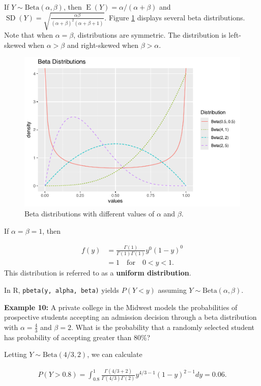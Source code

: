 \documentclass[
]{krantz}
\newcommand{\E}{\operatorname{E}}
\newcommand{\SD}{\operatorname{SD}}
\begin{document}
If \(Y \sim \textrm{Beta}(\alpha, \beta)\), then \(\E(Y) = \alpha/(\alpha + \beta)\) and \(\SD(Y) = \displaystyle \sqrt{\frac{\alpha \beta}{(\alpha + \beta)^2 (\alpha+\beta+1)}}\). Figure \ref{fig:multBeta} displays several beta distributions.  Note that when \(\alpha = \beta\), distributions are symmetric. The distribution is left-skewed when \(\alpha > \beta\) and right-skewed when \(\beta > \alpha\).



\begin{figure}

{\centering \includegraphics[width=0.6\linewidth]{bookdown-BeyondMLR_files/figure-latex/multBeta-1} 

}

\caption{Beta distributions with different values of \(\alpha\) and \(\beta\).}\label{fig:multBeta}
\end{figure}

If \(\alpha = \beta = 1\), then

\begin{align*}
 f(y) &= \frac{\Gamma(1)}{\Gamma(1)\Gamma(1)}y^0(1-y)^0 \\
      &= 1 \quad \textrm{for} \quad 0 < y < 1.
\end{align*}
This distribution is referred to as a \textbf{uniform distribution}.

In R, \texttt{pbeta(y,\ alpha,\ beta)} yields \(P(Y < y)\) assuming \(Y \sim \textrm{Beta}(\alpha, \beta)\).

\textbf{Example 10:} A private college in the Midwest models the probabilities of prospective students accepting an admission decision through a beta distribution with \(\alpha = \frac{4}{3}\) and \(\beta = 2\). What is the probability that a randomly selected student has probability of accepting greater than 80\%?

Letting \(Y \sim \textrm{Beta}(4/3,2)\), we can calculate

\begin{align*} 
P(Y > 0.8) = \int_{0.8}^1 \frac{\Gamma(4/3 + 2)}{\Gamma(4/3)\Gamma(2)} y^{4/3-1} (1-y)^{2-1}dy = 0.06.
\end{align*}
\end{document}
